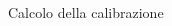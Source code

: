 \documentclass [xcolor=svgnames] {beamer}
\begin{document}
\begin{frame}{Calcolo della calibrazione}
	\begin{columns}%
		\begin{column}{0.45\textwidth}%
			\begin{figure}%
				\centering

\end{figure}
\end{column}
\end{columns}
\end{frame}
\end{document}
